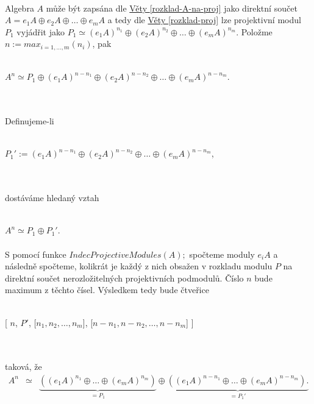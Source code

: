       \paragraph{ } Algebra $A$ může být zapsána dle \hyperref[rozklad-A-na-proj]{Věty \ref*{rozklad-A-na-proj}} jako direktní součet 
      $A=e_1A\oplus e_2A\oplus \ldots \oplus e_mA$ 
      a tedy dle \hyperref[rozklad-proj]{Věty \ref*{rozklad-proj}} lze projektivní modul $P_1$ vyjádřit jako
      $P_1\simeq(e_1A)^{n_1}\oplus(e_2A)^{n_2}\oplus \ldots \oplus(e_mA)^{n_m}$.
       Položme $n:=max_{i=1,\ldots,m}(n_i)$, pak \\\\
       \centerline{$A^n\simeq P_1\oplus(e_1A)^{n-n_1}\oplus(e_2A)^{n-n_2}\oplus \ldots \oplus(e_mA)^{n-n_m}$.} \\\\ 
       Definujeme-li \\\\
       \centerline{$P_1':=(e_1A)^{n-n_1}\oplus(e_2A)^{n-n_2}\oplus \ldots \oplus(e_mA)^{n-n_m}$,}  
       \\\\
       dostáváme hledaný vztah  \\\\
       \centerline{$A^n\simeq P_1\oplus P_1'$.}   

      \paragraph{ }  S pomocí funkce $IndecProjectiveModules(A);$ spočteme 
      moduly $e_iA$ a následně spočteme, kolikrát je každý z nich obsažen v 
      rozkladu modulu $P$ na direktní součet nerozložitelných projektivních podmodulů. 
      Číslo $n$ bude maximum z těchto čísel.
      Výsledkem tedy bude čtveřice \\\\
        \centerline{
          [ $n$, $P'$, [$n_1,n_2,\ldots,n_m$], [$n-n_1,n-n_2,\ldots,n-n_m$] ]
        }\\\\
      taková, že
      \begin{eqnarray}
        A^n &\simeq&
        \underbrace{((e_1A)^{n_1}\oplus \ldots \oplus(e_mA)^{n_m})}_{=P_1}
            \oplus
        \underbrace{((e_1A)^{n-n_1}\oplus \ldots \oplus(e_mA)^{n-n_m}).}_{=P_1'} 
        \nonumber
      \end{eqnarray}
      
